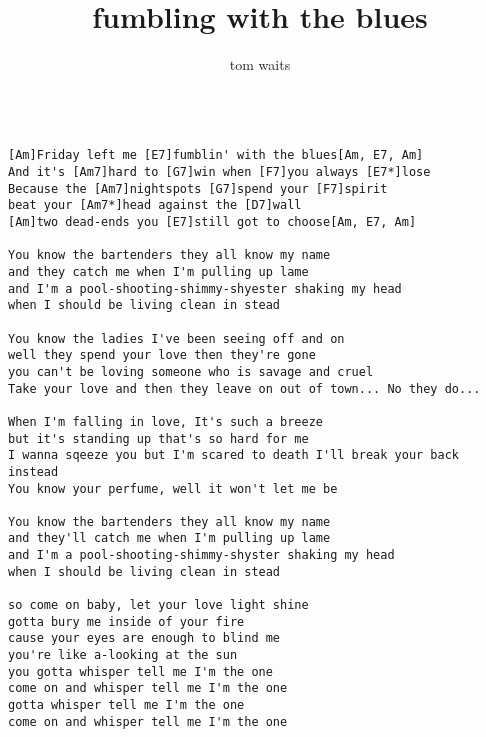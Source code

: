 \author{tom waits}
\title{fumbling with the blues}
\maketitle
\begin{verbatim}

[Am]Friday left me [E7]fumblin' with the blues[Am, E7, Am]
And it's [Am7]hard to [G7]win when [F7]you always [E7*]lose
Because the [Am7]nightspots [G7]spend your [F7]spirit
beat your [Am7*]head against the [D7]wall
[Am]two dead-ends you [E7]still got to choose[Am, E7, Am]

You know the bartenders they all know my name
and they catch me when I'm pulling up lame
and I'm a pool-shooting-shimmy-shyester shaking my head
when I should be living clean in stead

You know the ladies I've been seeing off and on
well they spend your love then they're gone
you can't be loving someone who is savage and cruel
Take your love and then they leave on out of town... No they do...

When I'm falling in love, It's such a breeze
but it's standing up that's so hard for me
I wanna sqeeze you but I'm scared to death I'll break your back instead
You know your perfume, well it won't let me be

You know the bartenders they all know my name
and they'll catch me when I'm pulling up lame
and I'm a pool-shooting-shimmy-shyster shaking my head
when I should be living clean in stead

so come on baby, let your love light shine
gotta bury me inside of your fire
cause your eyes are enough to blind me
you're like a-looking at the sun
you gotta whisper tell me I'm the one
come on and whisper tell me I'm the one
gotta whisper tell me I'm the one
come on and whisper tell me I'm the one
\end{verbatim}